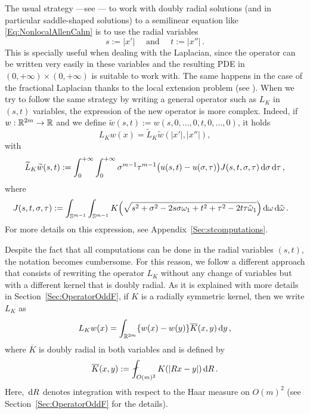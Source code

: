 The usual strategy ---see \cite{CabreTerraI, CabreTerraII,Cabre-Saddle, CabreRosOton-DoubleRev, Cinti-Saddle, Cinti-Saddle2}--- to work with doubly radial solutions (and in particular saddle-shaped solutions) to a semilinear equation like \eqref{Eq:NonlocalAllenCahn} is to use the radial variables 
$$
s := |x'| \quad \text{ and } \quad t:=|x''|\,.
$$
This is specially useful when dealing with the Laplacian, since the operator can be written very easily in these variables and the resulting PDE in $(0,+\infty)\times (0,+\infty)$ is suitable to work with. The same happens in the case of the fractional Laplacian thanks to the local extension problem (see \cite{CaffarelliSilvestre}). When we try to follow the same strategy by writing a general operator such as $L_K$ in $(s,t)$ variables, the expression of the new operator is more complex. Indeed, if $w:\mathbb{R}^{2m} \to \mathbb{R}$ and we define $\widetilde{w}(s,t) := w(s,0,...,0,t,0,...,0)$, it holds
$$ L_Kw(x) = \widetilde{L}_K \widetilde{w} (|x'|,|x''|), $$
with
$$
\widetilde{L}_K \widetilde{w} (s,t) := \int_0^{+\infty}  \int_0^{+\infty} \sigma^{m-1} \tau^{m-1} \big(u(s,t) - u(\sigma, \tau)\big) J(s,t,\sigma, \tau)  \,\mathrm{d} \sigma\,\mathrm{d} \tau\,,
$$
where
\begin{align*}
J(s,t,\sigma, \tau) &:= \int_{\mathbb{S}^{m-1}}  \int_{\mathbb{S}^{m-1}} K\Big( \sqrt{s^2+\sigma^2- 2 s \sigma \omega_1 + t^2 + \tau^2 - 2t \tau\tilde\omega_1}\Big) \,\mathrm{d} \omega \,\mathrm{d} \tilde\omega\,.
\end{align*}
For more details on this expression, see Appendix~\ref{Sec:stcomputations}. 


Despite the fact that all computations can be done in the radial variables  $(s,t)$, the notation becomes cumbersome. For this reason, we follow a different approach that consists of rewriting the operator $L_K$ without any change of variables but with a different kernel that is doubly radial. As it is explained with more details in Section~\ref{Sec:OperatorOddF}, if $K$ is a radially symmetric kernel, then we write $L_K$ as
$$
L_K w(x) = \int_{\mathbb{R}^{2m}} \{w(x) - w(y)\} \overline{K}(x,y) \,\mathrm{d} y\,,
$$
where $\overline{K}$ is doubly radial in both variables and is defined by
\begin{equation*}
\overline{K}(x,y) := \average_{O(m)^2} K(|Rx - y|)\d R\,.
\end{equation*}
Here, $\,\mathrm{d} R$ denotes integration with respect to the Haar measure on $O(m)^2$ (see Section~\ref{Sec:OperatorOddF} for the details).


